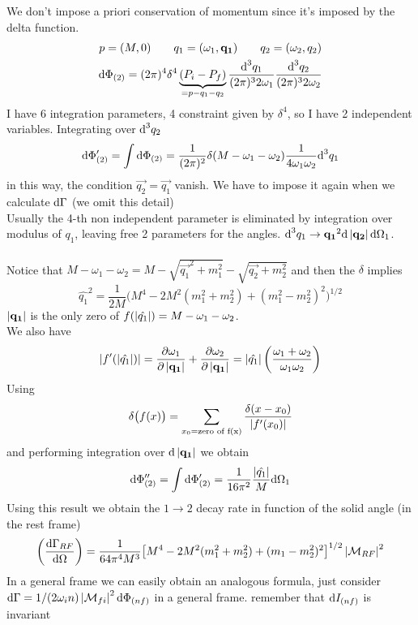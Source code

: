 \begin{example}[1 $\to$ 2 decay]
We don't impose a priori conservation of momentum since it's imposed by the delta function.
\begin{gather}
p = (M, 0) \qquad
q_1 = (\omega_1, \mathbf{q_1}) \qquad
q_2 = (\omega_2, q_2) \notag \\
\textup{d} \Phi_{(2)} = (2 \pi)^4 \delta^4 \underbrace{(P_i - P_f)}_{= p - q_1 - q_2}
	\frac{\textup{d}^3 q_1}{(2 \pi)^3 2 \omega_1} \frac{\textup{d}^3 q_2}{(2 \pi)^3 2 \omega_2} \notag
\end{gather}
I have 6 integration parameters, 4 constraint given by $\delta^4$, so I have 2 independent variables. Integrating over $\textup{d}^3 q_2$
\[
\textup{d} \Phi'_{(2)} = \int \textup{d} \Phi_{(2)} = \frac{1}{(2 \pi)^2} \delta(M - \omega_1 - \omega_2) \frac{1}{4 \omega_1 \omega_2} \textup{d}^3 q_1
\]
in this way, the condition $\vec{q_2} = \vec{q_1}$ vanish. We have to impose it again when we calculate $\textup{d} \Gamma$ (we omit this detail)\\
Usually the 4-th non independent parameter is eliminated by integration over modulus of $q_1$, leaving free 2 parameters for the angles. 
$\textup{d}^3 q_1 \to \mathbf{q_1}^2 \textup{d} \left\lvert \mathbf{q_2} \right\rvert\textup{d} \Omega_1$.\\ \\
Notice that $M -\omega_1 - \omega_2 = M - \sqrt{\vec{q_1}^2 + m_1^2} - \sqrt{\vec{q_2} + m_2^2}$ and then the $\delta$ implies
\[
\hat{q_1}^2 = \frac{1}{2M} \biggl( M^4 - 2M^2(m_1^2 + m_2^2) + (m_1^2 - m_2^2)^2 \biggr)^{1/2}
\]
$\left\lvert \mathbf{q_1} \right\rvert$ is the only zero of $f(\left\lvert \hat{q_1} \right\rvert) = M - \omega_1 - \omega_2$.\\
We also have
\[
\left\lvert f'(\left\lvert \hat{q_1} \right\rvert) \right\rvert = \frac{\partial \omega_1}{\partial \left\lvert \mathbf{q_1} \right\rvert} 
	+ \frac{\partial \omega_2}{\partial \left\lvert \mathbf{q_1} \right\rvert} 
	= \left\lvert \hat{q_1} \right\rvert \biggl ( \frac{\omega_1 + \omega_2}{\omega_1 \omega_2} \biggr)
\]
Using
\[
\delta \bigl( f(x) \bigr) = \sum_{x_0 = \textup{zero of f(x)}} \frac{\delta (x - x_0)}{\left\lvert f'(x_0) \right\rvert} 
\]
and performing integration over $\textup{d} \left\lvert \mathbf{q_1} \right\rvert$ we obtain
\[
\textup{d} \Phi''_{(2)} = \int \textup{d} \Phi'_{(2)} = \frac{1}{16 \pi^2} \frac{\left\lvert \hat{q_1} \right\rvert}{M} \textup{d} \Omega_1
\]
Using this result we obtain the $1 \to 2$ decay rate in function of the solid angle (in the rest frame)
\[
\biggl( \frac{\textup{d} \Gamma_{RF}}{\textup{d} \Omega} \biggr) = \frac{1}{64 \pi^4 M^3}
	\bigl[ M^4 - 2M^2 (m_1^2 + m_2^2) + (m_1 - m_2^2)^2 \bigr]^{1/2} \left\lvert \mathcal{M}_{RF} \right\rvert^2
\]
In a general frame we can easily obtain an analogous formula, just consider $\textup{d} \Gamma = 1/(2 \omega_in) \left\lvert \mathcal{M}_{fi} \right\rvert^2 \textup{d} \Phi_{(nf)}$ in a general frame. remember that $\textup{d} I_{(nf)}$ is invariant \\ \\

\end{example}
